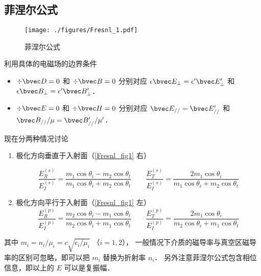 
\begin{issues}
\issueTODO
\end{issues}


\subsection{菲涅尔公式}
\begin{figure}[ht]
\centering
\texttt{[image: ./figures/Fresnl\_1.pdf]}
\caption{菲涅尔公式} \label{Fresnl_fig1}
\end{figure}
 
利用具体的电磁场的边界条件 %
\begin{itemize}
\item $\div \bvec D = 0$ 和 $\div \bvec B = 0$  分别对应 $\epsilon \bvec E_\bot = \epsilon' \bvec E'_\bot$ 和 $\epsilon \bvec B_\bot = \epsilon' \bvec B'_\bot$．

\item $\div \bvec E = 0$ 和 $\div \bvec H = 0$ 分别对应 $\bvec E_{//} = \bvec E'_{//}$ 和 $\bvec B_{//}/\mu = \bvec B'_{//}/\mu'$．
\end{itemize}

现在分两种情况讨论
\begin{enumerate}
\item 极化方向垂直于入射面（\autoref{Fresnl_fig1} 右）

\begin{equation}
\frac{E_R^{(s)}}{E_I^{(s)}} =  \frac{m_1\cos{\theta_i} - m_2\cos\theta_t}{m_1\cos\theta_i + m_2\cos\theta_t}
\qquad
\frac{E_T^{(s)}}{E_I^{(s)}} = \frac{2 m_1\cos\theta_i}{m_1\cos\theta_i + m_2\cos\theta_t}
\end{equation}

\item 极化方向平行于入射面（\autoref{Fresnl_fig1} 左）
\begin{equation}\label{Fresnl_eq2}
\frac{E_R^{(p)}}{E_I^{(p)}} =  \frac{m_2\cos\theta_i - m_1\cos\theta_t}{m_2 \cos\theta_i + m_1\cos\theta_t}
\qquad
\frac{E_T^{(p)}}{E_I^{(p)}} =  \frac{2 m_1\cos\theta_i}{m_2\cos\theta_i + m_1\cos\theta_t}
\end{equation}
\end{enumerate}
其中 $m_i=n_i/\mu_i = c\sqrt{\epsilon_i/\mu_i}$ （$i=1,2$）， 一般情况下介质的磁导率与真空区磁导率的区别可忽略，即可以把 $m_i$ 替换为折射率 $n_i$． 另外注意菲涅尔公式包含相位信息，即以上的 $E$ 可以是复振幅．

